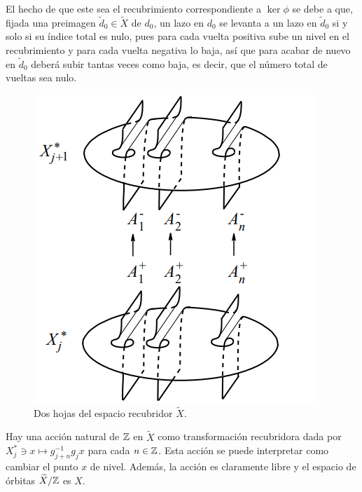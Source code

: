 \documentclass[TFG.tex]{subfiles}
\begin{document}

El hecho de que este sea el recubrimiento correspondiente a $\ker\phi$ se debe a que, fijada una preimagen $\tilde{d}_0\in\widetilde{X}$ de $d_0$, un lazo en $d_0$ se levanta a un lazo en $\tilde{d}_0$ si y solo si su índice total es nulo, pues para cada vuelta positiva sube un nivel en el recubrimiento y para cada vuelta negativa lo baja, así que para acabar de nuevo en $\tilde{d}_0$ deberá subir tantas veces como baja, es decir, que el número total de vueltas sea nulo.\\

\vspace{0.1cm}

\begin{figure}[h!]
\includegraphics[scale=0.6]{Imagenes/recubrimiento}
\caption{Dos hojas del espacio recubridor $\widetilde{X}$.}\label{recubrimiento}
\end{figure}
Hay una acción natural de $\mathbb{Z}$ en $\widetilde{X}$ como transformación recubridora dada por $X^*_j\ni x\mapsto g_{j+n}^{-1}g_jx$ para cada $n\in\mathbb{Z}$. Esta acción se puede interpretar como cambiar el punto $x$ de nivel. Además, la acción es claramente libre y el espacio de órbitas $\widetilde{X}/\mathbb{Z}$ es $X$.%


\end{document}
